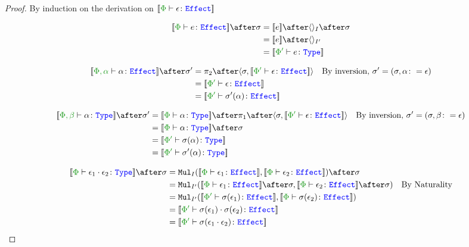 \documentclass{report}
\begin{document}
\begin{framed}
    \begin{proof}
        By induction on the derivation on $\deno{\typerelation{\P}{\e}{\effect}}$
        
        \case{\eground}
        \begin{align*}
            \deno{\typerelation{\P}{e}{\effect}}\after\si & = \deno{e}\after\term{I}\after\si \\
            & = \deno{e}\after\term{I'} \\
            & = \deno{\typerelation{\P'}{e}{\type}}\\
        \end{align*}
        
        \case{\evar}
        \begin{align*}
            \deno{\typerelation{\P,\a}{\a}{\effect}}\after\si' &= \pp\after\pr{\si}{\deno{\typerelation{\P'}{\e}{\effect}}}\qt{By inversion, $\si' = (\si, \a\setto\e)$}\\
            & =\deno{\typerelation{\P'}{\e}{\effect}} \\
            &= \deno{\typerelation{\P'}{\si'(\a)}{\effect}}\\
        \end{align*}
        
        \case{\eweaken}
        \begin{align*}
            \deno{\typerelation{\P, \b}{\a}{\type}}\after\si' &= \deno{\typerelation{\P}{\a}{\type}} \after \p\after\pr{\si}{\deno{\typerelation{\P'}{\e}{\effect}}}\qt{By inversion, $\si' = (\si, \b\setto\e)$}\\
            & = \deno{\typerelation{\P}{\a}{\type}}\after\si\\
            & = \deno{\typerelation{\P'}{\si(\a)}{\type}}\\
            & = \deno{\typerelation{\P'}{\si'(\a)}{\type}}\\
        \end{align*}
        
        \case{\ecompose}
        \begin{align*}
            \deno{\typerelation{\P}{\e_1\dot\e_2}{\type}} \after\si &=
            \Mul_{I}(\deno{\typerelation{\P}{\e_1}{\effect}}, \deno{\typerelation{\P}{\e_2}{\effect}})\after \si \\
            & = \Mul_{I'}(\deno{\typerelation{\P}{\e_1}{\effect}}\after \si, \deno{\typerelation{\P}{\e_2}{\effect}}\after \si)\qt{By Naturality}\\
            & = \Mul_{I'}(\deno{\typerelation{\P'}{\si(\e_1)}{\effect}}, \deno{\typerelation{\P}{\si(\e_2)}{\effect}})\\
            & = \deno{\typerelation{\P'}{\si(\e_1)\dot\si(\e_2)}{\effect}}\\
            & = \deno{\typerelation{\P'}{\si(\e_1\dot\e_2)}{\effect}}\\
        \end{align*}
        

\end{proof}
\end{framed}
\end{document}
